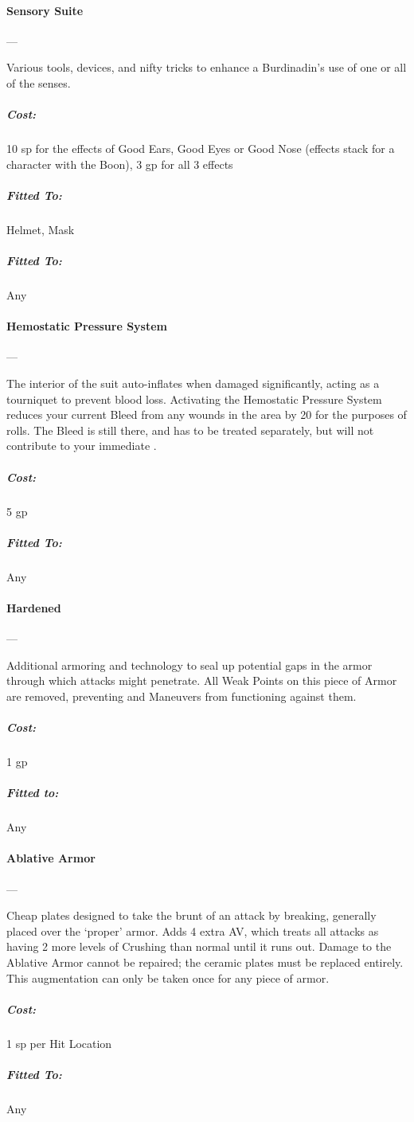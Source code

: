 \documentclass[oneside,11pt,english]{book}
\begin{document}
\paragraph{Sensory Suite}---

Various tools, devices, and nifty tricks to enhance a Burdinadin’s use of one or all of the senses. 
\vspace{-15pt}\subparagraph{Cost:} 10 sp for the effects of Good Ears, Good Eyes or Good Nose (effects stack for a character with the Boon), 3 gp for all 3 effects
\vspace{-15pt}\subparagraph{Fitted To:} Helmet, Mask
\vspace{-15pt}\subparagraph{Fitted To:} Any

\paragraph{Hemostatic Pressure System}---\quad[1]

The interior of the suit auto-inflates when damaged significantly, acting as a tourniquet to prevent blood 
loss. Activating the Hemostatic Pressure System reduces your current Bleed from any wounds in the area 
by 20 for the purposes of  rolls. The Bleed is still there, and has to be treated separately, but
will not contribute to your immediate .
\subparagraph{Cost:} 5 gp
\vspace{-15pt}\subparagraph{Fitted To:} Any

\paragraph{Hardened}---\quad[1]

Additional armoring and technology to seal up potential gaps in the armor through which attacks might 
penetrate. All Weak Points on this piece of Armor are removed, preventing  and  Maneuvers from functioning against them. %
\vspace{-15pt}\subparagraph{Cost:} 1 gp
\vspace{-15pt}\subparagraph{Fitted to:} Any

\paragraph{Ablative Armor}---\quad[1]

Cheap plates designed to take the brunt of an attack by breaking, generally placed over the ‘proper’ armor. Adds 4 extra AV, which treats all attacks as having 2 more levels of Crushing than normal until it runs out. Damage to the Ablative Armor cannot be repaired; the ceramic plates must be replaced entirely. This augmentation can only be taken once for any piece of armor. 
\vspace{-15pt}\subparagraph{Cost:} 1 sp per Hit Location
\vspace{-15pt}\subparagraph{Fitted To:} Any
\end{document}
